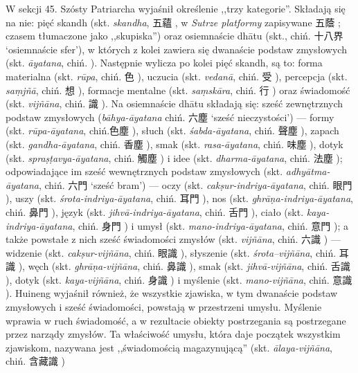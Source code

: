 W sekcji 45. Szósty Patriarcha wyjaśnił określenie ,,trzy kategorie''.
Składają się na nie: pięć skandh (skt. \textit{skandha}, 五蘊 , w \textit{Sutrze platformy} zapisywane 五蔭 ; czasem tłumaczone jako ,,skupiska'') oraz osiemnaście dhātu (skt., chiń. 十八界  `osiemnaście sfer'), w których z kolei zawiera się dwanaście podstaw zmysłowych (skt. \textit{āyatana}, chiń. ).
Następnie wylicza po kolei pięć skandh, są to: forma materialna (skt. \textit{rūpa}, chiń. 色 ), uczucia (skt. \textit{vedanā}, chiń. 受 ), percepcja (skt. \textit{sa\d{m}jñā}, chiń. 想 ), formacje mentalne (skt. \textit{sa\d{m}skāra}, chiń. 行 ) oraz świadomość (skt. \textit{vijñāna}, chiń. 識 ).
Na osiemnaście dhātu składają się: sześć zewnętrznych podstaw zmysłowych (\textit{bāhya-āyatana} chiń. 六塵 `sześć nieczystości') %
--- formy (skt. \textit{rūpa-āyatana}, chiń.色塵 ), słuch (skt. \textit{śabda-āyatana}, chiń. 聲塵 ), zapach (skt. \textit{gandha-āyatana}, chiń. 香塵 ), smak (skt. \textit{rasa-āyatana}, chiń. 味塵 ), dotyk (skt. \textit{spra\d{s}\d{t}avya-āyatana}, chiń. 觸塵 ) i idee (skt. \textit{dharma-āyatana}, chiń. 法塵 );
odpowiadające im sześć wewnętrznych podstaw zmysłowych (skt. \textit{adhyātma-āyatana}, chiń. 六門  `sześć bram') --- oczy (skt. \textit{cak\d{s}ur-indriya-āyatana}, chiń. 眼門 ), uszy (skt. \textit{śrota-indriya-āyatana}, chiń. 耳門 ), nos (skt. \textit{ghrā\d{n}a-indriya-āyatana}, chiń. 鼻門 ), język (skt. \textit{jihvā-indriya-āyatana}, chiń. 舌門 ), ciało (skt. \textit{kaya-indriya-āyatana}, chiń. 身門 ) i umysł (skt. \textit{mano-indriya-āyatana}, chiń. 意門 );
a także powstałe z nich sześć świadomości zmysłów (skt. \textit{vijñāna}, chiń. 六識 ) --- widzenie (skt. \textit{cak\d{s}ur-vijñāna}, chiń. 眼識 ), słyszenie (skt. \textit{śrota--vijñāna}, chiń. 耳識 ), węch (skt. \textit{ghrā\d{n}a-vijñāna}, chiń. 鼻識 ), smak (skt. \textit{jihvā-vijñāna}, chiń. 舌識 ), dotyk (skt. \textit{kaya-vijñāna}, chiń. 身識 ) i myślenie (skt. \textit{mano-vijñāna}, chiń. 意識 ).
Huineng wyjaśnił również, że wszystkie zjawiska, w tym dwanaście podstaw zmysłowych i sześć świadomości, powstają w przestrzeni umysłu.
Myślenie wprawia w ruch świadomość, a w rezultacie obiekty postrzegania są postrzegane przez narządy zmysłów.
Ta właściwość umysłu, która daje początek wszystkim zjawiskom, nazywana jest ,,świadomością magazynującą'' (skt. \textit{ālaya-vijñāna}, chiń. 含藏識 )\ibid

